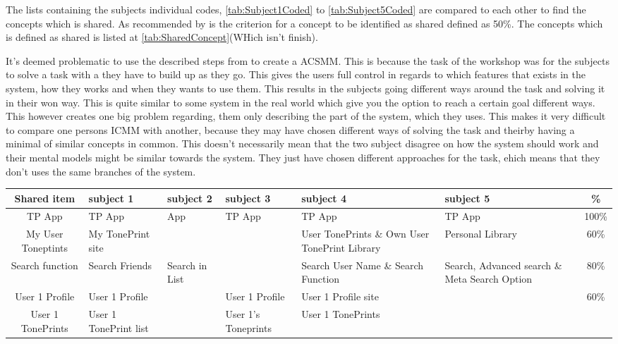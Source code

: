 The lists containing the subjects individual codes, \autoref{tab:Subject1Coded} to \autoref{tab:Subject5Coded} are compared to each other to find the concepts which is shared. As recommended by \textcite{WEB:ConceptMapAnalysis} is the criterion for a concept to be identified as shared defined as 50\%. The concepts which is defined as shared is listed at \autoref{tab:SharedConcept}(WHich isn't finish). 

It's deemed problematic to use the described steps from \textcite{WEB:ConceptMapAnalysis} to create a ACSMM. This is because the task of the workshop was for the subjects to solve a task with a they have to build up as they go. This gives the users full control in regards to which features that exists in the system, how they works and when they wants to use them. This results in the subjects going different ways around the task and solving it in their won way. This is quite similar to some system in the real world which give you the option to reach a certain goal different ways. This however creates one big problem regarding, them only describing the part of the system, which they uses. This makes it very difficult to compare one persons ICMM with another, because they may have chosen different ways of solving the task and theirby having a minimal of similar concepts in common. This doesn't necessarily mean that the two subject disagree on how the system should work and their mental models might be similar towards the system. They just have chosen different approaches for the task, ehich means that they don't uses the same branches of the system. \\

\begin{table}[]
	\centering
	\begin{tabular}[width=\textwidth]{c|lllllc}
\hline 
Shared item & subject 1 & subject 2 & subject 3 & subject 4 & subject 5 & \%	\\ \hline
TP App & TP App & App & TP App & TP App & TP App & 100\%	\\ 
My User Toneptints & My TonePrint site &  &  & User TonePrints \& Own User TonePrint Library & Personal Library & 60\% \\
Search function & Search Friends & Search in List & & Search User Name \& Search Function & Search, Advanced search \& Meta Search Option & 80\% \\
User 1 Profile & User 1 Profile & & User 1 Profile & User 1 Profile site & & 60\% \\
User 1 TonePrints & User 1 TonePrint list & & User 1's Toneprints & User 1 TonePrints
	\end{tabular}
\end{table}

